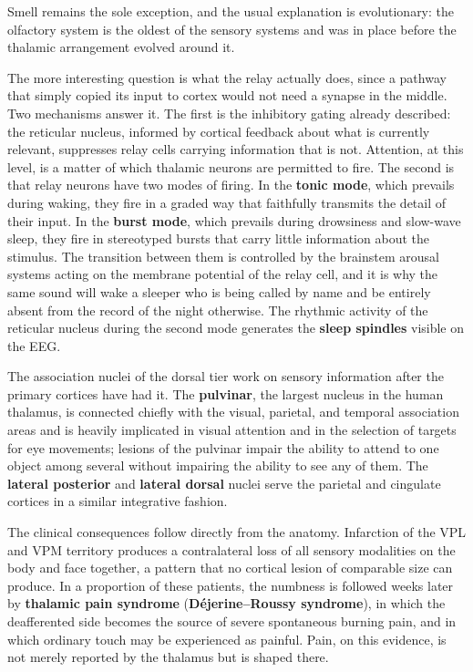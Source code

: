 \documentclass[11pt]{article}
\begin{document}
Smell remains the sole exception, and the usual explanation is evolutionary: the olfactory system is the oldest of the sensory systems and was in place before the thalamic arrangement evolved around it.

The more interesting question is what the relay actually does, since a pathway that simply copied its input to cortex would not need a synapse in the middle. Two mechanisms answer it. The first is the inhibitory gating already described: the reticular nucleus, informed by cortical feedback about what is currently relevant, suppresses relay cells carrying information that is not. Attention, at this level, is a matter of which thalamic neurons are permitted to fire. The second is that relay neurons have two modes of firing. In the \textbf{tonic mode}, which prevails during waking, they fire in a graded way that faithfully transmits the detail of their input. In the \textbf{burst mode}, which prevails during drowsiness and slow-wave sleep, they fire in stereotyped bursts that carry little information about the stimulus. The transition between them is controlled by the brainstem arousal systems acting on the membrane potential of the relay cell, and it is why the same sound will wake a sleeper who is being called by name and be entirely absent from the record of the night otherwise. The rhythmic activity of the reticular nucleus during the second mode generates the \textbf{sleep spindles} visible on the EEG.

The association nuclei of the dorsal tier work on sensory information after the primary cortices have had it. The \textbf{pulvinar}, the largest nucleus in the human thalamus, is connected chiefly with the visual, parietal, and temporal association areas and is heavily implicated in visual attention and in the selection of targets for eye movements; lesions of the pulvinar impair the ability to attend to one object among several without impairing the ability to see any of them. The \textbf{lateral posterior} and \textbf{lateral dorsal} nuclei serve the parietal and cingulate cortices in a similar integrative fashion.

The clinical consequences follow directly from the anatomy. Infarction of the VPL and VPM territory produces a contralateral loss of all sensory modalities on the body and face together, a pattern that no cortical lesion of comparable size can produce. In a proportion of these patients, the numbness is followed weeks later by \textbf{thalamic pain syndrome} (\textbf{D\'ejerine--Roussy syndrome}), in which the deafferented side becomes the source of severe spontaneous burning pain, and in which ordinary touch may be experienced as painful. Pain, on this evidence, is not merely reported by the thalamus but is shaped there.
\end{document}
